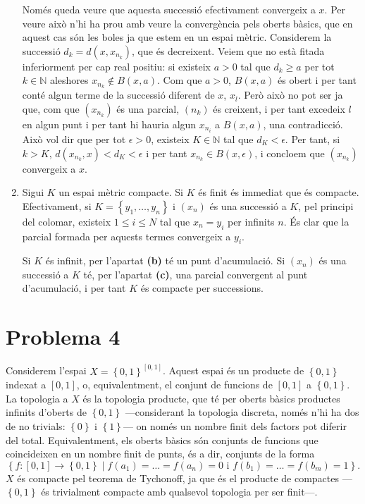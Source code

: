 \documentclass[12pt]{article}
\numberwithin{table}{section}
\numberwithin{figure}{section}
\numberwithin{equation}{section}
\newcommand{\N}{\mathbb{N}}
\newcommand{\set}[1]{\left\{ #1\right\}}
\begin{document}
\begin{enumerate}[label=(\alph*), font=\bfseries \sffamily, wide, labelwidth=!, labelindent=0pt]
		Només queda veure que aquesta successió efectivament convergeix a \( x \). Per veure això n'hi ha prou amb veure la convergència pels oberts bàsics, que en aquest cas són les boles ja que estem en un espai mètric. Considerem la successió \( d_k = d(x, x_{n_k}) \), que és decreixent. Veiem que no està fitada inferiorment per cap real positiu: si existeix \( a > 0 \) tal que \( d_k \geq a \) per tot \( k \in \N \) aleshores \( x_{n_k} \notin B(x,a) \). Com que \( a > 0 \), \( B(x, a) \) és obert i per tant conté algun terme de la successió diferent de \( x \), \( x_l \). Però això no pot ser ja que, com que \( (x_{n_k}) \) és una parcial, \( (n_k) \) és creixent, i per tant excedeix \( l \) en algun punt i per tant hi hauria algun \( x_{n_i} \) a \( B(x,a) \), una contradicció. Això vol dir que per tot \( \epsilon > 0 \), existeix \( K \in \N \) tal que \( d_K < \epsilon \). Per tant, si \( k > K \), \( d(x_{n_k}, x) < d_K < \epsilon \) i per tant \( x_{n_k} \in B(x,\epsilon) \), i concloem que \( (x_{n_k}) \) convergeix a \( x \). 

	\item Sigui \( K \) un espai mètric compacte. Si \( K \) és finit és immediat que és compacte. Efectivament, si \( K = \set{y_1, \dots, y_n} \) i \( (x_n) \) és una successió a \( K \), pel principi del colomar, existeix \( 1 \leq i \leq N \) tal que \( x_n = y_i \) per infinits \( n \). És clar que la parcial formada per aquests termes convergeix a \( y_i \).  

		Si \( K \) és infinit, per l'apartat \textbf{\textsf{(b)}} té un punt d'acumulació. Si \( (x_n) \) és una successió a \( K \) té, per l'apartat \textbf{\textsf{(c)}}, una parcial convergent al punt d'acumulació, i per tant \( K \) és compacte per successions.  
\end{enumerate}

\section*{Problema 4}
Considerem l'espai \( X = \set{0,1}^{[0,1]} \). Aquest espai és un producte de \( \set{0,1} \) indexat a \( [0,1] \), o, equivalentment, el conjunt de funcions de \( [0,1] \) a \( \set{0,1} \). La topologia a \( X \) és la topologia producte, que té per oberts bàsics productes infinits d'oberts de \( \set{0,1} \) ---considerant la topologia discreta, només n'hi ha dos de no trivials: \( \set{0} \) i \( \set{1} \)--- on només un nombre finit dels factors pot diferir del total. Equivalentment, els oberts bàsics són conjunts de funcions que coincideixen en un nombre finit de punts, és a dir, conjunts de la forma
\begin{equation*}
	\set{f \colon [0,1] \to \set{0,1} \mid f(a_1) = \dots = f(a_n) = 0 \text{ i } f(b_1) = \dots = f(b_m) = 1}.
\end{equation*}
\( X \) és compacte pel teorema de Tychonoff, ja que és el producte de compactes --- \( \set{0,1} \) és trivialment compacte amb qualsevol topologia per ser finit---. 
\end{document}
